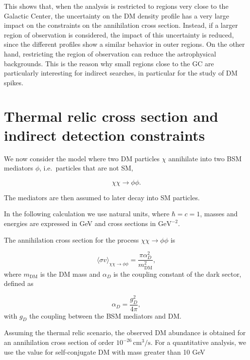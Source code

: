 This shows that, when the analysis is restricted to regions very close to the Galactic Center, the uncertainty on the DM density profile has a very large impact on the constraints on the annihilation cross section.
Instead, if a larger region of observation is considered, the impact of this uncertainty is reduced, since the different profiles show a similar behavior in outer regions.
On the other hand, restricting the region of observation can reduce the astrophysical backgrounds.
This is the reason why small regions close to the GC are particularly interesting for indirect searches, in particular for the study of DM spikes.


\section{Thermal relic cross section and indirect detection constraints}
\label{sec:relic_constraints}


We now consider the model where two DM particles $\chi$ annihilate into two BSM mediators $\phi$, i.e.\ particles that are not SM, 

\begin{equation}
    \chi\chi \to \phi\phi .
\end{equation}

The mediators are then assumed to later decay into SM particles.

In the following calculation we use natural units, where \(\hbar=c=1\), masses and energies are expressed in GeV and cross sections in $\mathrm{GeV}^{-2}$. 


The annihilation cross section for the process \(\chi\chi\to\phi\phi\) is~\cite{cirelli2025darkmatter}

\begin{equation}
\label{eq:sigmav_dark_sector}
\langle \sigma v \rangle_{\chi\chi\to\phi\phi}
=
\frac{\pi\alpha_D^2}{m_{\mathrm{DM}}^2},
\end{equation}
where \(m_{\mathrm{DM}}\) is the DM mass and \(\alpha_D\) is the coupling constant of
the dark sector, defined as

\begin{equation}
\label{eq:alphaD_def}
\alpha_D = \frac{g_D^2}{4\pi},
\end{equation}
with \(g_D\) the coupling between the BSM mediators and DM.

Assuming the thermal relic scenario, the observed DM abundance is obtained for an annihilation cross section of order \(10^{-26}\,\mathrm{cm^3/s}\).
For a quantitative analysis, we use the value for self-conjugate DM with mass greater than 10 GeV \cite{Steigman_2012}

